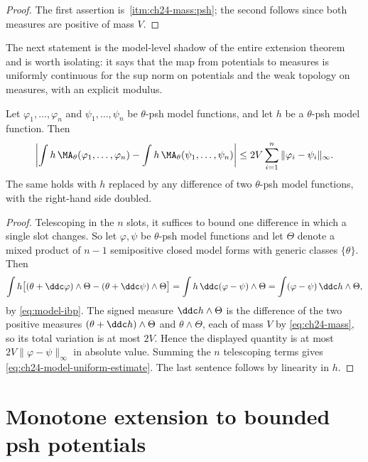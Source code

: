 \begin{proof}
The first assertion is
\,\cref{itm:ch24-mass:psh}; the second follows since both
measures are positive of mass \(V\).
\end{proof}

The next statement is the model-level shadow of the entire extension theorem
and is worth isolating: it says that the map from potentials to measures is
uniformly continuous for the sup norm on potentials and the weak topology on
measures, with an explicit modulus.

\begin{proposition}
\label{prop:ch24-model-uniform-estimate}
Let \(\varphi_1,\ldots,\varphi_n\) and \(\psi_1,\ldots,\psi_n\) be
\(\theta\)-psh model functions, and let \(h\) be a \(\theta\)-psh model
function.  Then
\begin{equation}
\label{eq:ch24-model-uniform-estimate}
 \left|\int h\,\MA_\theta(\varphi_1,\ldots,\varphi_n)
      -\int h\,\MA_\theta(\psi_1,\ldots,\psi_n)\right|
 \leq 2V\sum_{i=1}^{n}\|\varphi_i-\psi_i\|_\infty .
\end{equation}
The same holds with \(h\) replaced by any difference of two \(\theta\)-psh
model functions, with the right-hand side doubled.
\end{proposition}

\begin{proof}
Telescoping in the \(n\) slots, it suffices to bound one difference in which
a single slot changes.  So let \(\varphi,\psi\) be \(\theta\)-psh model
functions and let \(\Theta\) denote a mixed product of \(n-1\) semipositive
closed model forms with generic classes \(\{\theta\}\).  Then
\[
 \int h\bigl[(\theta+\ddc\varphi)\wedge\Theta
   -(\theta+\ddc\psi)\wedge\Theta\bigr]
 =\int h\,\ddc(\varphi-\psi)\wedge\Theta
 =\int(\varphi-\psi)\,\ddc h\wedge\Theta,
\]
by \eqref{eq:model-ibp}.  The signed measure \(\ddc h\wedge\Theta\) is the
difference of the two positive measures \((\theta+\ddc h)\wedge\Theta\) and
\(\theta\wedge\Theta\), each of mass \(V\) by
\eqref{eq:ch24-mass}, so its total variation is at most \(2V\).  Hence the
displayed quantity is at most \(2V\|\varphi-\psi\|_\infty\) in absolute
value.  Summing the \(n\) telescoping terms gives
\eqref{eq:ch24-model-uniform-estimate}.  The last sentence follows by
linearity in \(h\).
\end{proof}

\section{Monotone extension to bounded psh potentials}
\label{sec:ch24-bounded}

